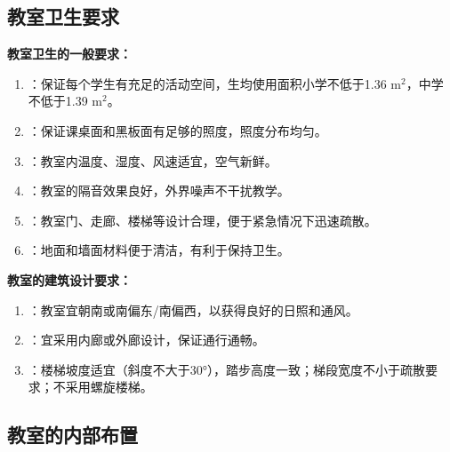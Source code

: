 \subsection{教室卫生要求}

\begin{keybox}
\textbf{教室卫生的一般要求：}

\begin{enumerate}[leftmargin=*]
    \item {}：保证每个学生有充足的活动空间，生均使用面积小学不低于1.36 $\mathrm{m}^2$，中学不低于1.39 $\mathrm{m}^2$。
    \item {}：保证课桌面和黑板面有足够的照度，照度分布均匀。
    \item {}：教室内温度、湿度、风速适宜，空气新鲜。
    \item {}：教室的隔音效果良好，外界噪声不干扰教学。
    \item {}：教室门、走廊、楼梯等设计合理，便于紧急情况下迅速疏散。
    \item {}：地面和墙面材料便于清洁，有利于保持卫生。
\end{enumerate}

\textbf{教室的建筑设计要求：}

\begin{enumerate}[leftmargin=*]
    \item {}：教室宜朝南或南偏东/南偏西，以获得良好的日照和通风。
    \item {}：宜采用内廊或外廊设计，保证通行通畅。
    \item {}：楼梯坡度适宜（斜度不大于30°），踏步高度一致；梯段宽度不小于疏散要求；不采用螺旋楼梯。
\end{enumerate}
\end{keybox}

\subsection{教室的内部布置}

